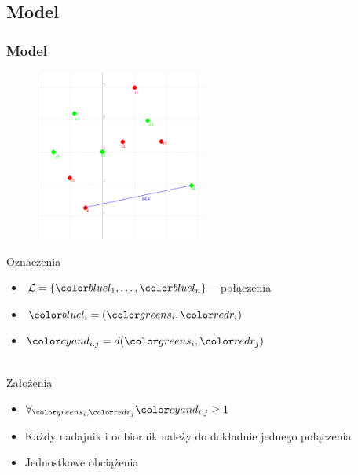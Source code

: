 \documentclass[polish, t,10pt]{beamer}
\begin{document}
\subsection{Model}
    \begin{frame}
        \frametitle{Model}
        \begin{figure}
            \includegraphics[width=0.5\textwidth]{pictures/model-variables.png}
        \end{figure}
        Oznaczenia
        \begin{itemize}
            \item $\mathcal{L} = \{\lo, \ldots, \ln\}$ - połączenia
            \item $\li = (\si, \ri)$
            \item $\dij = d(\si, \rj)$
        \end{itemize}
        ~\\
        Założenia
        \begin{itemize}
            \item $\forall_{\si, \rj} \dij \geq 1$
            \item Każdy nadajnik i odbiornik należy do dokładnie jednego połączenia
            \item Jednostkowe obciążenia
        \end{itemize}
    \end{frame}
\end{document}
